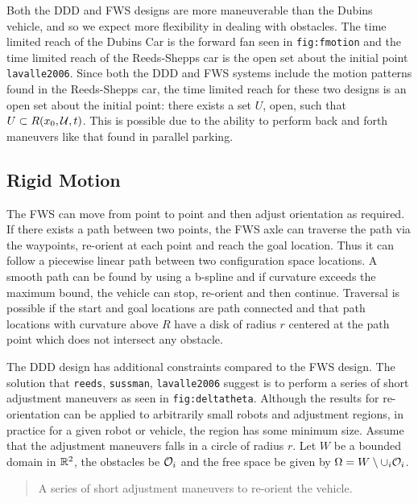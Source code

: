 Both the DDD and FWS designs are more maneuverable than the Dubins
vehicle, and so we expect more flexibility in dealing with obstacles.
The time limited reach of the Dubins Car is the forward fan seen in
\texttt{fig:fmotion} and the time limited reach of the Reeds-Shepps car
is the open set about the initial point \texttt{lavalle2006}. Since both
the DDD and FWS systems include the motion patterns found in the
Reeds-Shepps car, the time limited reach for these two designs is an
open set about the initial point: there exists a set \(U\), open, such
that \(U \subset R(x_0,{\cal U},t )\). This is possible due to the
ability to perform back and forth maneuvers like that found in parallel
parking.

\hypertarget{rigid-motion}{%
\subsection{Rigid Motion}\label{rigid-motion}}

The FWS can move from point to point and then adjust orientation as
required. If there exists a path between two points, the FWS axle can
traverse the path via the waypoints, re-orient at each point and reach
the goal location. Thus it can follow a piecewise linear path between
two configuration space locations. A smooth path can be found by using a
b-spline and if curvature exceeds the maximum bound, the vehicle can
stop, re-orient and then continue. Traversal is possible if the start
and goal locations are path connected and that path locations with
curvature above \(R\) have a disk of radius \(r\) centered at the path
point which does not intersect any obstacle.

The DDD design has additional constraints compared to the FWS design.
The solution that \texttt{reeds}, \texttt{sussman}, \texttt{lavalle2006}
suggest is to perform a series of short adjustment maneuvers as seen in
\texttt{fig:deltatheta}. Although the results for re-orientation can be
applied to arbitrarily small robots and adjustment regions, in practice
for a given robot or vehicle, the region has some minimum size. Assume
that the adjustment maneuvers falls in a circle of radius \(r\). Let
\(W\) be a bounded domain in \({\Bbb R}^2\), the obstacles be
\({\cal O}_i\) and the free space be given by
\(\Omega = W\setminus \cup_{i}{\cal O}_i\).

\begin{quote}
A series of short adjustment maneuvers to re-orient the vehicle.
\end{quote}

